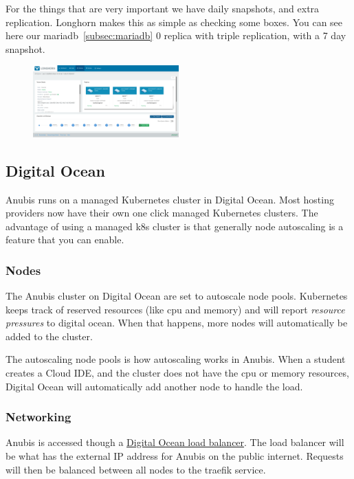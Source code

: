 For the things that are very important we have daily snapshots, and extra replication.
Longhorn makes this as simple as checking some boxes.
You can see here our mariadb~\ref{subsec:mariadb} 0 replica with triple replication, 
with a 7 day snapshot.

\begin{figure}
    \centering
    \includegraphics[width=0.5\textwidth]{figures/longhorn-mariadb}
\end{figure}

\subsection{Digital Ocean}\label{subsec:digital-ocean}

Anubis runs on a managed Kubernetes cluster in Digital Ocean.
Most hosting providers now have their own one click managed Kubernetes clusters.
The advantage of using a managed k8s cluster is that generally node autoscaling is
a feature that you can enable.

\subsubsection{Nodes}\label{subsubsec:digital-ocean-nodes}

The Anubis cluster on Digital Ocean are set to autoscale node pools.
Kubernetes keeps track of reserved resources (like cpu and memory) and will
report \textit{resource pressures} to digital ocean.
When that happens, more nodes will automatically be added to the cluster.

The autoscaling node pools is how autoscaling works in Anubis.
When a student creates a Cloud IDE, and the cluster does not have the cpu or 
memory resources, Digital Ocean will automatically add another node to handle the load.

\subsubsection{Networking}\label{subsubsec:digital-ocean-networking}

Anubis is accessed though a \href{https://docs.digitalocean.com/products/networking/load-balancers/}{Digital Ocean load balancer}.
The load balancer will be what has the external IP address for Anubis on the public internet.
Requests will then be balanced between all nodes to the traefik service.

